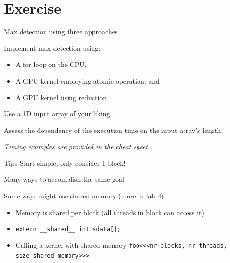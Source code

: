 \documentclass[11pt,t]{beamer}
\newcommand{\inline}[1]{ \colorbox{mygray}{\lstinline{#1}}}
\begin{document}
\section{Exercise}

\begin{frame}{Max detection using three approaches} 

    Implement max detection using:
    \vspace{1mm}
    \begin{itemize}\setlength\itemsep{0.75em}
        \item A for loop on the CPU,
        \item A GPU kernel employing atomic operation, and
        \item A GPU kernel using reduction.
    \end{itemize}
    
    \vspace{3mm}
    
    Use a 1D input array of your liking.
    
    \vspace{3mm}
    
    Assess the dependency of the execution time on the input array's length.
    
    \vspace{3mm}

    \textit{Timing examples are provided in the cheat sheet.}

\end{frame}

\begin{frame}{Tips}
Start simple, only consider 1 block!

\vspace{2mm}

Many ways to accomplish the same goal

\vspace{2mm}

Some ways might use shared memory (more in lab 4)

\begin{itemize}\setlength\itemsep{1em}
    \item Memory is shared per block (all threads in block can access it)
    \item \inline{extern __shared__ int sdata[];}
    \item Calling a kernel with shared memory \inline{foo<<<nr_blocks, nr_threads, size_shared_memory>>>}
\end{itemize}

\end{frame}
\end{document}
